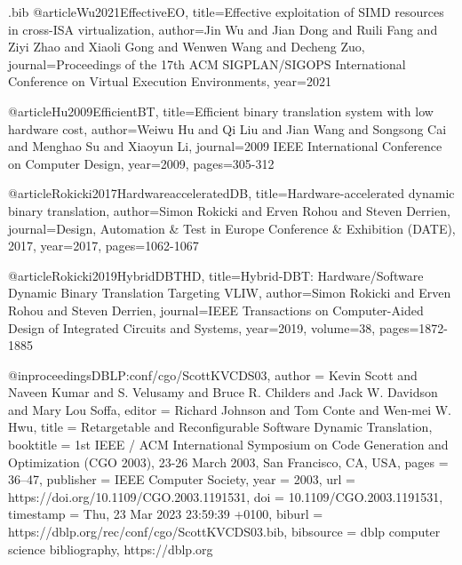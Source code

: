 \begin{filecontents}{\jobname.bib}
@article{Wu2021EffectiveEO,
  title={Effective exploitation of SIMD resources in cross-ISA virtualization},
  author={Jin Wu and Jian Dong and Ruili Fang and Ziyi Zhao and Xiaoli Gong and Wenwen Wang and Decheng Zuo},
  journal={Proceedings of the 17th ACM SIGPLAN/SIGOPS International Conference on Virtual Execution Environments},
  year={2021}
}

@article{Hu2009EfficientBT,
  title={Efficient binary translation system with low hardware cost},
  author={Weiwu Hu and Qi Liu and Jian Wang and Songsong Cai and Menghao Su and Xiaoyun Li},
  journal={2009 IEEE International Conference on Computer Design},
  year={2009},
  pages={305-312}
}

@article{Rokicki2017HardwareacceleratedDB,
  title={Hardware-accelerated dynamic binary translation},
  author={Simon Rokicki and Erven Rohou and Steven Derrien},
  journal={Design, Automation \& Test in Europe Conference \& Exhibition (DATE), 2017},
  year={2017},
  pages={1062-1067}
}

@article{Rokicki2019HybridDBTHD,
  title={Hybrid-DBT: Hardware/Software Dynamic Binary Translation Targeting VLIW},
  author={Simon Rokicki and Erven Rohou and Steven Derrien},
  journal={IEEE Transactions on Computer-Aided Design of Integrated Circuits and Systems},
  year={2019},
  volume={38},
  pages={1872-1885}
}

@inproceedings{DBLP:conf/cgo/ScottKVCDS03,
  author       = {Kevin Scott and
                  Naveen Kumar and
                  S. Velusamy and
                  Bruce R. Childers and
                  Jack W. Davidson and
                  Mary Lou Soffa},
  editor       = {Richard Johnson and
                  Tom Conte and
                  Wen{-}mei W. Hwu},
  title        = {Retargetable and Reconfigurable Software Dynamic Translation},
  booktitle    = {1st {IEEE} / {ACM} International Symposium on Code Generation and
                  Optimization {(CGO} 2003), 23-26 March 2003, San Francisco, CA, {USA}},
  pages        = {36--47},
  publisher    = {{IEEE} Computer Society},
  year         = {2003},
  url          = {https://doi.org/10.1109/CGO.2003.1191531},
  doi          = {10.1109/CGO.2003.1191531},
  timestamp    = {Thu, 23 Mar 2023 23:59:39 +0100},
  biburl       = {https://dblp.org/rec/conf/cgo/ScottKVCDS03.bib},
  bibsource    = {dblp computer science bibliography, https://dblp.org}
}


\end{filecontents}
